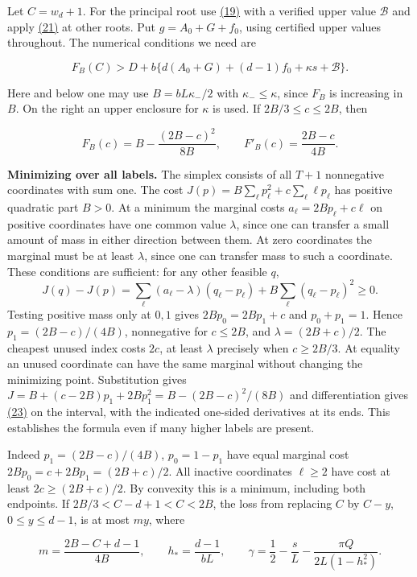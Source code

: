 \documentclass[11pt,a4paper]{article}
\begin{document}
Let \(C=w_d+1\). For the principal root use \hyperref[eq:19]{(19)} with a verified upper value \(\mathcal B\) and apply \hyperref[eq:21]{(21)} at other roots. Put \(g=A_0+G+f_0\), using certified upper values throughout. The numerical conditions we need are

\[
 F_B(C)> D+b\{d(A_0+G)+(d-1)f_0+\kappa s+\mathcal B\}.                  \tag{22}\label{eq:22}
\]

Here and below one may use \(B=bL\kappa_-/2\) with \(\kappa_-\le\kappa\), since \(F_B\) is increasing in \(B\). On the right an upper enclosure for \(\kappa\) is used. If \(2B/3\le c\le2B\), then

\[
 F_B(c)=B-\frac{(2B-c)^2}{8B},\qquad
 F'_B(c)=\frac{2B-c}{4B}.                                                 \tag{23}\label{eq:23}
\]

\textbf{Minimizing over all labels.} The simplex consists of all \(T+1\) nonnegative coordinates with sum one. The cost \(J(p)=B\sum_\ell p_\ell^2+c\sum_\ell\ell p_\ell\) has positive quadratic part \(B>0\). At a minimum the marginal costs \(a_\ell=2Bp_\ell+c\ell\) on positive coordinates have one common value \(\lambda\), since one can transfer a small amount of mass in either direction between them. At zero coordinates the marginal must be at least \(\lambda\), since one can transfer mass to such a coordinate. These conditions are sufficient: for any other feasible \(q\), \[
 J(q)-J(p)=\sum_\ell(a_\ell-\lambda)(q_\ell-p_\ell)+B\sum_\ell(q_\ell-p_\ell)^2\ge0 .
\] Testing positive mass only at \(0,1\) gives \(2Bp_0=2Bp_1+c\) and \(p_0+p_1=1\). Hence \(p_1=(2B-c)/(4B)\), nonnegative for \(c\le2B\), and \(\lambda=(2B+c)/2\). The cheapest unused index costs \(2c\), at least \(\lambda\) precisely when \(c\ge2B/3\). At equality an unused coordinate can have the same marginal without changing the minimizing point. Substitution gives \(J=B+(c-2B)p_1+2Bp_1^2=B-(2B-c)^2/(8B)\) and differentiation gives \hyperref[eq:23]{(23)} on the interval, with the indicated one-sided derivatives at its ends. This establishes the formula even if many higher labels are present.

Indeed \(p_1=(2B-c)/(4B)\), \(p_0=1-p_1\) have equal marginal cost \(2Bp_0=c+2Bp_1=(2B+c)/2\). All inactive coordinates \(\ell\ge2\) have cost at least \(2c\ge(2B+c)/2\). By convexity this is a minimum, including both endpoints. If \(2B/3<C-d+1<C<2B\), the loss from replacing \(C\) by \(C-y\), \(0\le y\le d-1\), is at most \(my\), where

\[
 m=\frac{2B-C+d-1}{4B},\qquad
 h_*=\frac{d-1}{bL},\qquad
 \gamma=\frac12-\frac{s}{L}-\frac{\pi Q}{2L(1-h_*^2)}.                  \tag{24}\label{eq:24}
\]
\end{document}

